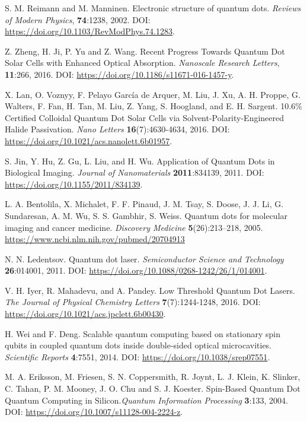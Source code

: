 \documentclass[../main.tex]{subfiles}
\begin{document}
\begin{thebibliography}{99}

 S. M. Reimann and M. Manninen. Electronic structure of quantum dots. \emph{Reviews of Modern Physics}, \textbf{74}:1238, 2002. DOI: \url{https://doi.org/10.1103/RevModPhys.74.1283}.

 Z. Zheng, H. Ji, P. Yu and Z. Wang. Recent Progress Towards Quantum Dot Solar Cells with Enhanced Optical Absorption. \emph{Nanoscale Research Letters}, \textbf{11}:266, 2016. DOI: \url{https://doi.org/10.1186/s11671-016-1457-y}.

 X. Lan, O. Voznyy, F. Pelayo García de Arquer, M. Liu, J. Xu, A. H. Proppe, G. Walters, F. Fan, H. Tan, M. Liu, Z. Yang, S. Hoogland, and E. H. Sargent. 10.6\% Certified Colloidal Quantum Dot Solar Cells via Solvent-Polarity-Engineered Halide Passivation. \emph{Nano Letters} \textbf{16}(7):4630-4634, 2016. DOI: \url{https://doi.org/10.1021/acs.nanolett.6b01957}.

 S. Jin, Y. Hu, Z. Gu, L. Liu, and H. Wu. Application of Quantum Dots in Biological Imaging. \emph{Journal of Nanomaterials} \textbf{2011}:834139, 2011. DOI: \url{https://doi.org/10.1155/2011/834139}.

 L. A. Bentolila, X. Michalet, F. F. Pinaud, J. M. Tsay, S. Doose, J. J. Li, G. Sundaresan, A. M. Wu, S. S. Gambhir, S. Weiss. Quantum dots for molecular imaging and cancer medicine. \emph{Discovery Medicine} \textbf{5}(26):213–218, 2005. \url{https://www.ncbi.nlm.nih.gov/pubmed/20704913}

 N. N. Ledentsov. Quantum dot laser. \emph{Semiconductor Science and Technology} \textbf{26}:014001, 2011. DOI: \url{https://doi.org/10.1088/0268-1242/26/1/014001}.

 V. H. Iyer, R. Mahadevu, and A. Pandey. Low Threshold Quantum Dot Lasers. \emph{The Journal of Physical Chemistry Letters} \textbf{7}(7):1244-1248, 2016. DOI: \url{https://doi.org/10.1021/acs.jpclett.6b00430}.

 H. Wei and F. Deng. Scalable quantum computing based on stationary spin qubits in coupled quantum dots inside double-sided optical microcavities. \emph{Scientific Reports} \textbf{4}:7551, 2014. DOI: \url{https://doi.org/10.1038/srep07551}.

 M. A. Eriksson, M. Friesen, S. N. Coppersmith, R. Joynt, L. J. Klein, K. Slinker, C. Tahan, P. M. Mooney, J. O. Chu and S. J. Koester. Spin-Based Quantum Dot Quantum Computing in Silicon.\emph{Quantum Information Processing} \textbf{3}:133, 2004. DOI: \url{https://doi.org/10.1007/s11128-004-2224-z}.


\end{thebibliography}
\end{document}
